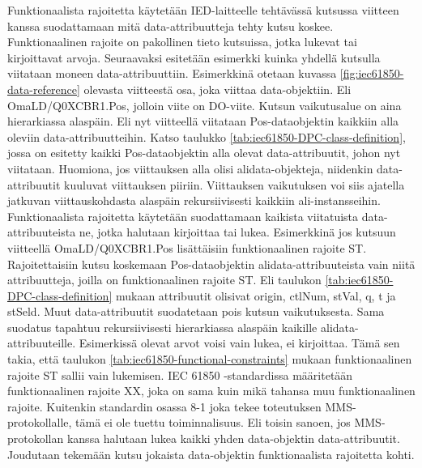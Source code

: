 Funktionaalista rajoitetta käytetään IED-laitteelle tehtävässä kutsussa viitteen kanssa suodattamaan mitä data-attribuutteja tehty kutsu koskee. Funktionaalinen rajoite on pakollinen tieto kutsuissa, jotka lukevat tai kirjoittavat arvoja. Seuraavaksi esitetään esimerkki kuinka yhdellä kutsulla viitataan moneen data-attribuuttiin. Esimerkkinä otetaan kuvassa \ref{fig:iec61850-data-reference} olevasta viitteestä osa, joka viittaa data-objektiin. Eli OmaLD/Q0XCBR1.Pos, jolloin viite on DO-viite. Kutsun vaikutusalue on aina hierarkiassa alaspäin. Eli nyt viitteellä viitataan Pos-dataobjektin kaikkiin alla oleviin data-attribuutteihin. Katso taulukko \ref{tab:iec61850-DPC-class-definition}, jossa on esitetty kaikki Pos-dataobjektin alla olevat data-attribuutit, johon nyt viitataan. Huomiona, jos viittauksen alla olisi alidata-objekteja, niidenkin data-attribuutit kuuluvat viittauksen piiriin. Viittauksen vaikutuksen voi siis ajatella jatkuvan viittauskohdasta alaspäin rekursiivisesti kaikkiin ali-instansseihin. Funktionaalista rajoitetta käytetään suodattamaan kaikista viitatuista data-attribuuteista ne, jotka halutaan kirjoittaa tai lukea. Esimerkkinä jos kutsuun viitteellä OmaLD/Q0XCBR1.Pos lisättäisiin funktionaalinen rajoite ST. Rajoitettaisiin kutsu koskemaan Pos-dataobjektin alidata-attribuuteista vain niitä attribuutteja, joilla on funktionaalinen rajoite ST. Eli taulukon \ref{tab:iec61850-DPC-class-definition} mukaan attribuutit olisivat origin, ctlNum, stVal, q, t ja stSeld. Muut data-attribuutit suodatetaan pois kutsun vaikutuksesta. Sama suodatus tapahtuu rekursiivisesti hierarkiassa alaspäin kaikille alidata-attribuuteille. Esimerkissä olevat arvot voisi vain lukea, ei kirjoittaa. Tämä sen takia, että taulukon \ref{tab:iec61850-functional-constraints} mukaan funktionaalinen rajoite ST sallii vain lukemisen. IEC 61850 -standardissa määritetään funktionaalinen rajoite XX, joka on sama kuin mikä tahansa muu funktionaalinen rajoite. Kuitenkin standardin osassa 8-1 joka tekee toteutuksen MMS-protokollalle, tämä ei ole tuettu toiminnalisuus. Eli toisin sanoen, jos MMS-protokollan kanssa halutaan lukea kaikki yhden data-objektin data-attribuutit. Joudutaan tekemään kutsu jokaista data-objektin funktionaalista rajoitetta kohti.

